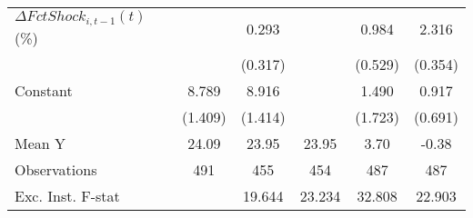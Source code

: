 {\begin{tabular}{l*{5}{c}}
\addlinespace
$ \Delta FctShock_{i,t-1}(t)$ (\%)&                     &       0.293         &                     &       0.984\sym{*}  &       2.316\sym{***}\\
                    &                     &     (0.317)         &                     &     (0.529)         &     (0.354)         \\
\addlinespace
Constant            &       8.789\sym{***}&       8.916\sym{***}&                     &       1.490         &       0.917         \\
                    &     (1.409)         &     (1.414)         &                     &     (1.723)         &     (0.691)         \\
\midrule
Mean Y              &       24.09         &       23.95         &       23.95         &        3.70         &       -0.38         \\
Observations        &         491         &         455         &         454         &         487         &         487         \\
Exc. Inst. F-stat   &                     &      19.644         &      23.234         &      32.808         &      22.903         \\
\bottomrule
\end{tabular}
}
